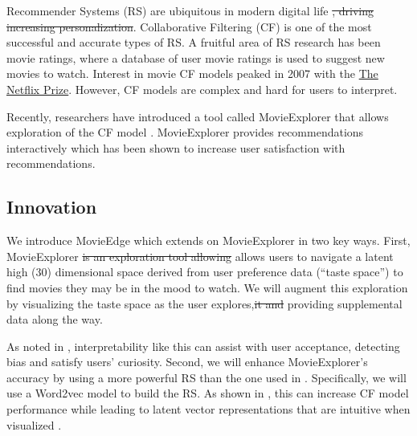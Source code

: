 Recommender Systems (RS) are ubiquitous in modern digital life \st{, driving increasing personalization}. Collaborative Filtering (CF) is one of the most successful and accurate types of RS. A fruitful area of RS research has been movie ratings, where a database of user movie ratings is used to suggest new movies to watch. Interest in movie CF models peaked in 2007 with the \href{https://www.netflixprize.com/}{The Netflix Prize}. However, CF models are complex and hard for users to interpret.

Recently, researchers have introduced a tool called MovieExplorer that allows exploration of the CF model \cite{taijala2018movieexplorer}. MovieExplorer provides recommendations interactively which has been shown to increase user satisfaction with recommendations.

\subsection{Innovation}

We introduce MovieEdge which extends on MovieExplorer in two key ways. First, MovieExplorer \st{is an exploration tool allowing} allows users to navigate a latent high (30) dimensional space derived from user preference data (“taste space”) to find movies they may be in the mood to watch. We will augment this exploration by visualizing the taste space as the user explores,\st{it and} providing supplemental data along the way.

As noted in \cite{Molnar2019interpretable}, interpretability like this can assist with user acceptance, detecting bias and satisfy users’ curiosity. Second, we will enhance MovieExplorer’s accuracy  by using a more powerful RS than the one used in  \cite{taijala2018movieexplorer}. Specifically, we will use a Word2vec model \cite{mikolov2013distributed} to build the RS. As shown in \cite{ozsoy2016word}, this can increase CF model performance while leading to latent vector representations that are intuitive when visualized \cite{mikolov2013distributed}. 